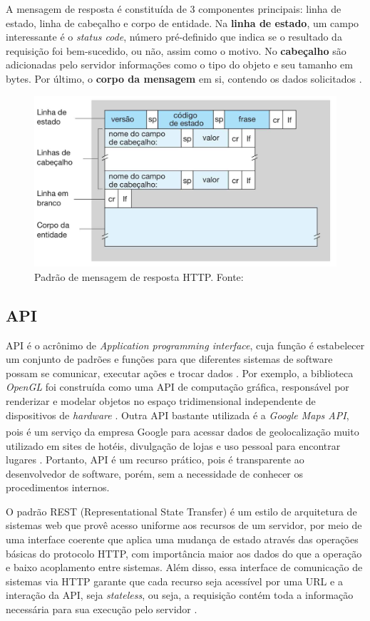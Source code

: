A mensagem de resposta é constituída de 3 componentes principais: linha de estado, linha de cabeçalho e corpo de entidade. Na \textbf{linha de estado}, um campo
interessante é o \textit{status code}, número pré-definido que indica se o resultado da requisição foi bem-sucedido, ou não, assim como o motivo. No \textbf{cabeçalho}
são adicionadas pelo servidor informações como o tipo do objeto e seu tamanho em bytes. Por último, o \textbf{corpo da mensagem} em si, contendo os dados solicitados \cite[pp. 78]{redes-kurose2010}.

\begin{figure}[ht]
    \centering
    \includegraphics[width=.55\textwidth]{img/mensagem-http-resposta.png}
    \caption{Padrão de mensagem de resposta HTTP. Fonte:\cite{redes-kurose2010}}\label{figMessageResponse}
\end{figure}

\subsection{API}

API é o acrônimo de \textit{Application programming interface}, cuja função é estabelecer um conjunto de padrões e funções
para que diferentes sistemas de software possam se comunicar, executar ações e trocar dados \cite{api-definition}. Por exemplo, a biblioteca
\textit{OpenGL} foi construída como uma API de computação gráfica, responsável por renderizar e modelar objetos no espaço tridimensional independente
de dispositivos de \textit{hardware} \cite{opengl-example}. Outra API bastante utilizada é a \textit{Google Maps API}, pois é um serviço da empresa Google\textsuperscript{\textregistered} 
para acessar dados de geolocalização muito utilizado em sites de hotéis, divulgação de lojas e uso pessoal para encontrar lugares \cite{google-maps-example}. Portanto, API é um recurso 
prático, pois é transparente ao desenvolvedor de software, porém, sem a necessidade de conhecer os procedimentos internos.

O padrão REST (Representational State Transfer) é um estilo de arquitetura de sistemas web 
que provê acesso uniforme aos recursos de um servidor, por meio de uma interface coerente que aplica uma mudança de
estado através das operações básicas do protocolo HTTP, com importância maior aos dados do que a operação e baixo acoplamento entre sistemas. 
Além disso, essa interface de comunicação de sistemas via HTTP garante que cada recurso seja acessível por
uma URL e a interação da API, seja \textit{stateless}, ou seja, a requisição contém toda a informação necessária
para sua execução pelo servidor \cite[pp. 384--386]{sistemas-distribuidos-coulouris2013}. 

